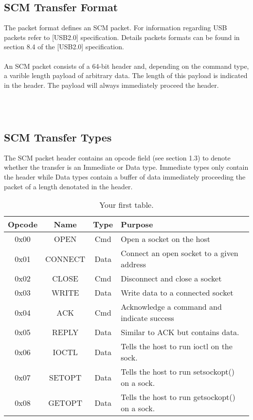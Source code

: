 \documentclass[10pt]{article}
\begin{document}
	\subsection{SCM Transfer Format}
	The packet format defines an SCM packet. For information regarding USB packets refer to [USB2.0] specification. Details packets formats can be found in section 8.4 of the [USB2.0] specification. \\
	\\
	An SCM packet consists of a 64-bit header and, depending on the command type, a varible length payload of arbitrary data. The length of this payload is indicated in the header.  The payload will always immediately proceed the header. \\
	\\
	\centerline {
	} \\
	\subsection{SCM Transfer Types}
	The SCM packet header contains an opcode field (see section 1.3) to denote whether the transfer is an Immediate or Data type. Immediate types only contain the header while Data types contain a buffer of data immediately proceeding the packet of a length denotated in the header.\\

	\begin{table}[h!]
		\begin{center}
			\caption{Your first table.}
			\label{tab:table1}
			\begin{tabular}{c|c|c|l} 
				\rowcolor{lightgray}
				\textbf{Opcode} &	\textbf{Name} &	\textbf{Type} & \textbf{Purpose}\\
				\hline
				0x00 & OPEN & Cmd & Open a socket on the host\\
				0x01 & CONNECT & Data & Connect an open socket to a given address\\
				0x02 & CLOSE & Cmd & Disconnect and close a socket\\
				0x03 & WRITE	 & Data & Write data to a connected socket\\
				0x04 & ACK	& Cmd & Acknowledge a command and indicate success\\
				0x05 & REPLY	& Data & Similar to ACK but contains data. \\
				0x06 & IOCTL	& Data & Tells the host to run ioctl on the sock. \\
				0x07 & SETOPT	& Data & Tells the host to run setsockopt() on a sock. \\
				0x08 & GETOPT	& Data & Tells the host to run getsockopt() on a sock. \\
			\end{tabular}
		\end{center}
	\end{table}
\end{document}
